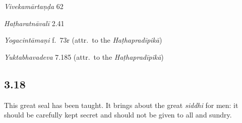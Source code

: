 \begin{ekdosis}
\begin{sources}[hp03_017]
\emph{Vivekamārtaṇḍa} 62
\begin{versinnote}
\tl{\var{tasya doṣāḥ ] sarvarogāḥ \vl, rogās tasya \vl}\\!}
\end{versinnote}
\end{sources}

\begin{testimonia}[hp03_017]
\emph{Haṭharatnāvalī} 2.41
\begin{versinnote}
\end{versinnote}

\emph{Yogacintāmaṇi} f.~73r (attr.~to the \emph{Haṭhapradīpikā})
\begin{versinnote}
\end{versinnote}

\emph{Yuktabhavadeva} 7.185 (attr.~to the \emph{Haṭhapradīpikā})
\begin{versinnote}
\end{versinnote}
\end{testimonia}


\subsection*{3.18}
\begin{translation}[hp03_018]
This great seal has been taught. It brings about the great \emph{siddhi} for men: it should be carefully kept secret and should not be given to all and sundry.
\end{translation}


\end{ekdosis}

